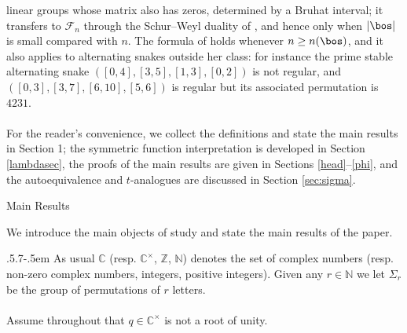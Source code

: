 \documentclass[11pt,reqno]{amsart}
\makeatletter
\theoremstyle{definition} \newtheorem*{defn}{Definition}
\theoremstyle{definition}
\numberwithin{equation}{section}
\def\section{\def\@secnumfont{\mdseries}\@startsection{section}{1}%
  \z@{.7\linespacing\@plus\linespacing}{.5\linespacing}%
  {\normalfont\scshape\centering}}
\def\subsection{\def\@secnumfont{\bfseries}\@startsection{subsection}{2}%
  {\parindent}{.5\linespacing\@plus.7\linespacing}{-.5em}%
  {\normalfont\bfseries}}
\makeatother
\begin{document}
linear groups whose matrix also has zeros, determined by a Bruhat interval; it transfers to $\mathscr F_n$ through the
Schur--Weyl duality of \cite{CP96}, and hence only when $|\bos|$ is small compared with $n$. The formula of \cite{BC25a} holds
whenever $n\ge n(\bos)$, and it also applies to alternating snakes outside her class: for instance the prime stable
alternating snake $([0,4],[3,5],[1,3],[0,2])$ is not regular, and $([0,3],[3,7],[6,10],[5,6])$ is regular but its associated
permutation is $4231$.\\\\
For the reader's convenience, we collect the definitions and state the main results in Section 1; the symmetric function
interpretation is developed in Section \ref{lambdasec}, the proofs of the main results are given in Sections
\ref{head}--\ref{phi}, and the autoequivalence and $t$-analogues are discussed in Section \ref{sec:sigma}.

\section{Main Results}\label{sec:main}


We introduce the main objects of study and state the main results of the paper.

\subsection{} As usual $\mathbb C$ (resp. $\mathbb C^\times$, $\mathbb Z$, $\mathbb N$) denotes the set of complex numbers (resp. non-zero complex numbers, integers, positive integers). Given any $r\in\mathbb N$ we let $\Sigma_r$ be the group of permutations of $r$ letters.\\\\
Assume throughout that $q\in \mathbb C^\times$ is not a root of unity.
\end{document}
